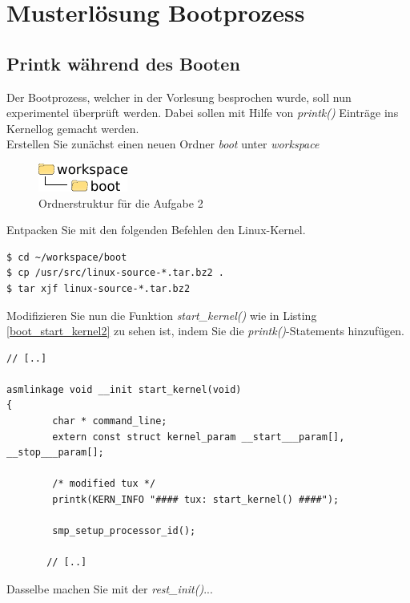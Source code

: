 \section{Musterlösung Bootprozess}

\subsection{Printk während des Booten}

Der Bootprozess, welcher in der Vorlesung besprochen wurde, soll nun experimentel überprüft werden.
Dabei sollen mit Hilfe von \emph{printk()} Einträge ins Kernellog gemacht werden. \\

Erstellen Sie zunächst einen neuen Ordner \emph{boot} unter \emph{workspace}

\begin{figure}[h!]
   \begin{center}
      \includegraphics{images/boot_dirs}
   \end{center}
   \caption{Ordnerstruktur für die Aufgabe 2}
\end{figure}

Entpacken Sie mit den folgenden Befehlen den Linux-Kernel.

\begin{lstlisting}
$ cd ~/workspace/boot
$ cp /usr/src/linux-source-*.tar.bz2 .
$ tar xjf linux-source-*.tar.bz2
\end{lstlisting}

Modifizieren Sie nun die Funktion \emph{start\_kernel()} wie in Listing \ref{boot_start_kernel2} zu sehen ist,
indem Sie die \emph{printk()}-Statements hinzufügen.

\begin{lstlisting}[label=boot_start_kernel2,caption=init/main.c]
// [..]

asmlinkage void __init start_kernel(void)
{
        char * command_line;
        extern const struct kernel_param __start___param[], __stop___param[];

        /* modified tux */
        printk(KERN_INFO "#### tux: start_kernel() ####");

        smp_setup_processor_id();

       // [..]
\end{lstlisting}

Dasselbe machen Sie mit der \emph{rest\_init()}...

